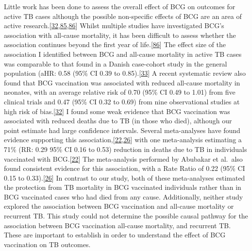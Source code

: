 \documentclass[11pt,twoside]{bristolthesis}
\begin{document}
  Little work has been done to assess the overall effect of BCG on outcomes for active TB cases although the possible non-specific effects of BCG are an area of active research.{[}\protect\hyperlink{ref-Higgins}{32},\protect\hyperlink{ref-Kandasamy2016}{85},\protect\hyperlink{ref-Pollard2017}{86}{]} Whilst multiple studies have investigated BCG's association with all-cause mortality, it has been difficult to assess whether the association continues beyond the first year of life.{[}\protect\hyperlink{ref-Pollard2017}{86}{]} The effect size of the association I identified between BCG and all-cause mortality in active TB cases was comparable to that found in a Danish case-cohort study in the general population (aHR: 0.58 (95\% CI 0.39 to 0.85).{[}\protect\hyperlink{ref-Rieckmann2016}{33}{]} A recent systematic review also found that BCG vaccination was associated with reduced all-cause mortality in neonates, with an average relative risk of 0.70 (95\% CI 0.49 to 1.01) from five clinical trials and 0.47 (95\% CI 0.32 to 0.69) from nine observational studies at high risk of bias.{[}\protect\hyperlink{ref-Higgins}{32}{]} I found some weak evidence that BCG vaccination was associated with reduced deaths due to TB (in those who died), although our point estimate had large confidence intervals. Several meta-analyses have found evidence supporting this association,{[}\protect\hyperlink{ref-Colditz1994}{22},\protect\hyperlink{ref-Abubakar2013}{26}{]} with one meta-analysis estimating a 71\% (RR: 0.29 95\% CI 0.16 to 0.53) reduction in deaths due to TB in individuals vaccinated with BCG.{[}\protect\hyperlink{ref-Colditz1994}{22}{]} The meta-analysis performed by Abubakar et al.~also found consistent evidence for this association, with a Rate Ratio of 0.22 (95\% CI 0.15 to 0.33).{[}\protect\hyperlink{ref-Abubakar2013}{26}{]} In contrast to our study, both of these meta-analyses estimated the protection from TB mortality in BCG vaccinated individuals rather than in BCG vaccinated cases who had died from any cause. Additionally, neither study explored the association between BCG vaccination and all-cause mortality or recurrent TB. This study could not determine the possible causal pathway for the association between BCG vaccination all-cause mortality, and recurrent TB. These are important to establish in order to understand the effect of BCG vaccination on TB outcomes.
  
\end{document}
